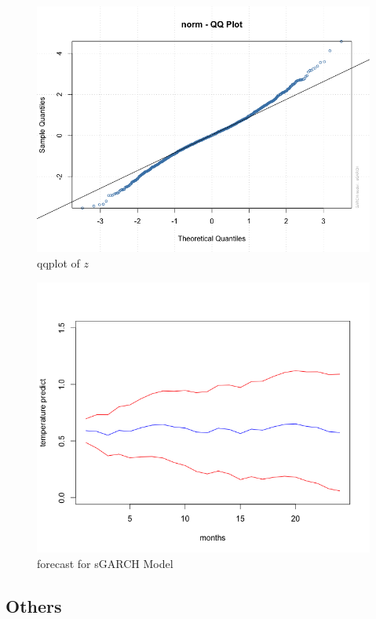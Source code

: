 \documentclass[a4paper,10pt]{article}
\begin{document}
\begin{figure}[H]
\centering
\caption{qqplot of $z$}
\includegraphics[scale=.50]{qqplot.png}
\end{figure}

\begin{figure}[H]
\centering
\caption{forecast for sGARCH Model}
\includegraphics[scale=.50]{predict01.png}
\end{figure}

\subsection{Others}
\end{document}

